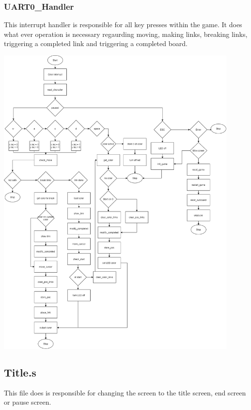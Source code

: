 \documentclass{article}
\begin{document}
    \subsubsection{UART0\_Handler}
        This interrupt handler is responsible for all key presses within
        the game.  It does what ever operation is necessary regaurding 
        moving, making links, breaking links, triggering a completed link and triggering
        a completed board.
        \begin{center}
            {\includegraphics[height=16cm]{UART0_Handler.png}\centering} 
        \end{center}
        \newpage   
  
        
\subsection{Title.s}
    This file does is responsible for changing the screen to
    the title screen, end screen or pause screen.
\end{document}
